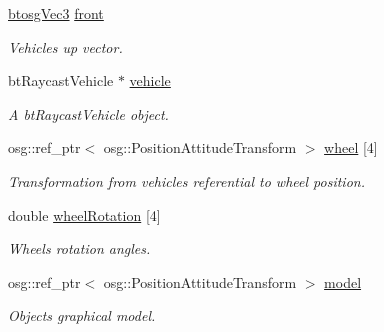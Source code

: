 \begin{DoxyCompactItemize}
\mbox{\label{classbtosgVehicle_a33d6c0dc296ac54ec4a37e34332fa446}} 
\hyperlink{classbtosgVec3}{btosg\+Vec3} \hyperlink{classbtosgVehicle_a33d6c0dc296ac54ec4a37e34332fa446}{front}
\begin{DoxyCompactList}\small\item\em Vehicle\textquotesingle{}s up vector. \end{DoxyCompactList}\item 
\mbox{\label{classbtosgVehicle_ac45b117f8b523f7040de99639deb7522}} 
bt\+Raycast\+Vehicle $\ast$ \hyperlink{classbtosgVehicle_ac45b117f8b523f7040de99639deb7522}{vehicle}
\begin{DoxyCompactList}\small\item\em A bt\+Raycast\+Vehicle object. \end{DoxyCompactList}\item 
\mbox{\label{classbtosgVehicle_a37edb4c28551037829ffd79c7bc315ba}} 
osg\+::ref\+\_\+ptr$<$ osg\+::\+Position\+Attitude\+Transform $>$ \hyperlink{classbtosgVehicle_a37edb4c28551037829ffd79c7bc315ba}{wheel} \mbox{[}4\mbox{]}
\begin{DoxyCompactList}\small\item\em Transformation from vehicle\textquotesingle{}s referential to wheel position. \end{DoxyCompactList}\item 
\mbox{\label{classbtosgVehicle_a0a9cd6f2c9b0defc44cd5e2e8d597418}} 
double \hyperlink{classbtosgVehicle_a0a9cd6f2c9b0defc44cd5e2e8d597418}{wheel\+Rotation} \mbox{[}4\mbox{]}
\begin{DoxyCompactList}\small\item\em Wheels\textquotesingle{} rotation angles. \end{DoxyCompactList}\item 
\mbox{\label{classbtosgObject_afd15726e7a214212d6d5815f8ac1ac6c}} 
osg\+::ref\+\_\+ptr$<$ osg\+::\+Position\+Attitude\+Transform $>$ \hyperlink{classbtosgObject_afd15726e7a214212d6d5815f8ac1ac6c}{model}
\begin{DoxyCompactList}\small\item\em Object\textquotesingle{}s graphical model. \end{DoxyCompactList}\item 

\end{DoxyCompactItemize}
